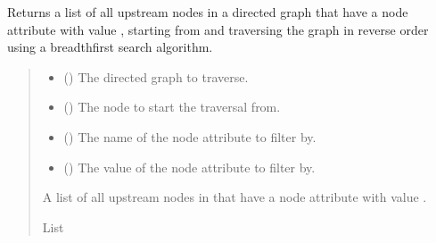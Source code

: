 \documentclass[letterpaper,10pt,english]{sphinxmanual}
\begin{document}
\begin{fulllineitems}
\label{\detokenize{pysewer:pysewer.helper.get_upstream_nodes}}
\pysigstartsignatures
{}
\pysigstopsignatures
\sphinxAtStartPar
Returns a list of all upstream nodes in a directed graph  that have a node attribute  with value ,
starting from  and traversing the graph in reverse order using a breadth\sphinxhyphen{}first search algorithm.
\begin{quote}\begin{description}
\begin{itemize}
\item {} 
\sphinxAtStartPar
{} () \textendash{} The directed graph to traverse.

\item {} 
\sphinxAtStartPar
{} () \textendash{} The node to start the traversal from.

\item {} 
\sphinxAtStartPar
{} () \textendash{} The name of the node attribute to filter by.

\item {} 
\sphinxAtStartPar
{} () \textendash{} The value of the node attribute to filter by.

\end{itemize}

\sphinxAtStartPar
A list of all upstream nodes in  that have a node attribute  with value .

\sphinxAtStartPar
List

\end{description}\end{quote}

\end{fulllineitems}
\end{document}
